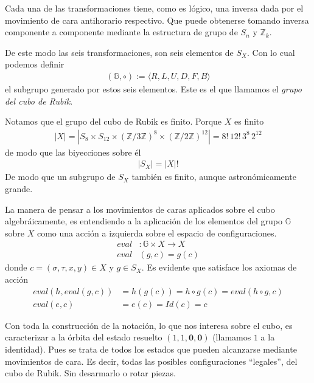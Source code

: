 \documentclass{article}
\theoremstyle{definition}
\newcommand{\Z}{\mathbb{Z}}
\newcommand{\G}{\mathbb{G}}
\newcommand{\comillas}[1]{``#1''}
\begin{document}
Cada una de las transformaciones tiene, como es lógico, una inversa dada por el movimiento de cara antihorario respectivo. Que puede obtenerse tomando inversa componente a componente mediante la estructura de grupo de $S_n$ y $\Z_k$.

De este modo las seis transformaciones, son seis elementos de $S_X$. Con lo cual podemos definir
\begin{align*}
    (\G,\circ):=\langle R,L,U,D,F,B\rangle
\end{align*}
el subgrupo generado por estos seis elementos. Este es el que llamamos el \textit{grupo del cubo de Rubik}.

Notamos que el grupo del cubo de Rubik es finito. Porque $X$ es finito
\begin{align*}
    |X|=\left|S_{8}\times S_{12}\times (\Z/3\Z)^{8}\times (\Z/2\Z)^{12}\right|=8!\,12!\, 3^{8}\,2^{12}
\end{align*}
de modo que las biyecciones sobre él
\begin{align*}
    |S_X|=|X|!
\end{align*}
De modo que un subgrupo de $S_X$ también es finito, aunque astronómicamente grande.

La manera de pensar a los movimientos de caras aplicados sobre el cubo algebráicamente, es entendiendo a la aplicación de los elementos del grupo $\G$ sobre $X$ como una acción a izquierda sobre el espacio de configuraciones.
\begin{align*}
    eval & :\G \times X\to X \\
    eval & (g,c)=g(c)
\end{align*}
donde $c=(\sigma,\tau,x,y)\in X$ y $g\in S_X$. Es evidente que satisface los axiomas de acción
\begin{align*}
    eval(h,eval(g,c)) & =h(g(c))=h\circ g(c)=eval(h\circ g,c) \\
    eval(e,c)         & =e(c)=Id(c)=c
\end{align*}

Con toda la construcción de la notación, lo que nos interesa sobre el cubo, es caracterizar a la órbita del estado resuelto $(1,1,\mathbf{0},\mathbf{0})$ (llamamos $1$ a la identidad). Pues se trata de todos los estados que pueden alcanzarse mediante movimientos de cara. Es decir, todas las posibles configuraciones \comillas{legales}, del cubo de Rubik. Sin desarmarlo o rotar piezas.
\end{document}

